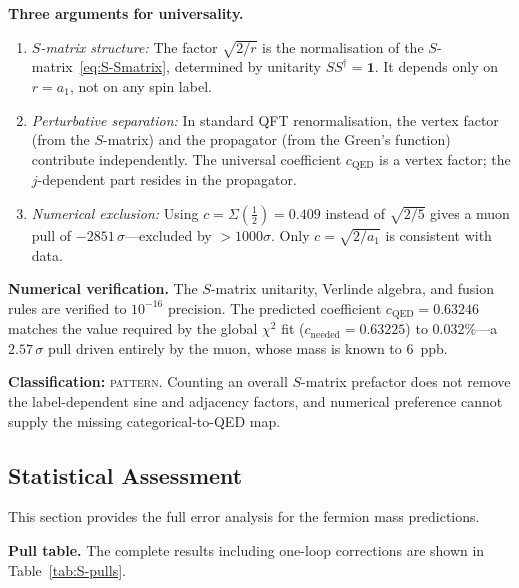 \documentclass[12pt,a4paper]{article}
\theoremstyle{definition}
\begin{document}
\textbf{Three arguments for universality.}
\begin{enumerate}
\item \emph{$S$-matrix structure:}  The factor $\sqrt{2/r}$ is the normalisation of the $S$-matrix~\eqref{eq:S-Smatrix}, determined by unitarity $SS^\dagger = \mathbf{1}$.  It depends only on $r = a_1$, not on any spin label.
\item \emph{Perturbative separation:}  In standard QFT renormalisation, the vertex factor (from the $S$-matrix) and the propagator (from the Green's function) contribute independently.  The universal coefficient $c_{\text{QED}}$ is a vertex factor; the $j$-dependent part resides in the propagator.
\item \emph{Numerical exclusion:}  Using $c = \Sigma(\tfrac{1}{2}) = 0.409$ instead of $\sqrt{2/5}$ gives a muon pull of $-2851\,\sigma$---excluded by $>1000\sigma$.  Only $c = \sqrt{2/a_1}$ is consistent with data.
\end{enumerate}

\textbf{Numerical verification.}  The $S$-matrix unitarity, Verlinde algebra, and fusion rules are verified to $10^{-16}$ precision.  The predicted coefficient $c_{\text{QED}} = 0.63246$ matches the value required by the global $\chi^2$ fit ($c_{\text{needed}} = 0.63225$) to $0.032\%$---a $2.57\,\sigma$ pull driven entirely by the muon, whose mass is known to $6$~ppb.

\textbf{Classification:} \textsc{pattern}.  Counting an overall \(S\)-matrix prefactor does not remove the label-dependent sine and adjacency factors, and numerical preference cannot supply the missing categorical-to-QED map.

\subsection{Statistical Assessment}
\label{sec:S-erroranalysis}

This section provides the full error analysis for the fermion mass predictions.

\textbf{Pull table.}  The complete results including one-loop corrections are shown in Table~\ref{tab:S-pulls}.
\end{document}
